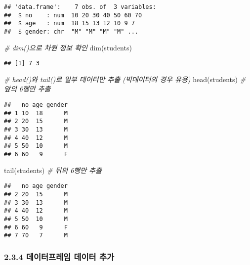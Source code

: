 \documentclass[
]{article}
\newenvironment{Shaded}{\begin{snugshade}}{\end{snugshade}}
\newcommand{\CommentTok}[1]{\textcolor[rgb]{0.56,0.35,0.01}{\textit{#1}}}
\newcommand{\FunctionTok}[1]{\textcolor[rgb]{0.00,0.00,0.00}{#1}}
\newcommand{\NormalTok}[1]{#1}
\begin{document}
\begin{verbatim}
## 'data.frame':    7 obs. of  3 variables:
##  $ no    : num  10 20 30 40 50 60 70
##  $ age   : num  18 15 13 12 10 9 7
##  $ gender: chr  "M" "M" "M" "M" ...
\end{verbatim}

\begin{Shaded}
\begin{Highlighting}[]
\CommentTok{\# dim()으로 차원 정보 확인}
\FunctionTok{dim}\NormalTok{(students)}
\end{Highlighting}
\end{Shaded}

\begin{verbatim}
## [1] 7 3
\end{verbatim}

\begin{Shaded}
\begin{Highlighting}[]
\CommentTok{\# head()와 tail()로 일부 데이터만 추출 (빅데이터의 경우 유용)}
\FunctionTok{head}\NormalTok{(students)   }\CommentTok{\# 앞의 6행만 추출}
\end{Highlighting}
\end{Shaded}

\begin{verbatim}
##   no age gender
## 1 10  18      M
## 2 20  15      M
## 3 30  13      M
## 4 40  12      M
## 5 50  10      M
## 6 60   9      F
\end{verbatim}

\begin{Shaded}
\begin{Highlighting}[]
\FunctionTok{tail}\NormalTok{(students)   }\CommentTok{\# 뒤의 6행만 추출}
\end{Highlighting}
\end{Shaded}

\begin{verbatim}
##   no age gender
## 2 20  15      M
## 3 30  13      M
## 4 40  12      M
## 5 50  10      M
## 6 60   9      F
## 7 70   7      M
\end{verbatim}

\hypertarget{uxb370uxc774uxd130uxd504uxb808uxc784-uxb370uxc774uxd130-uxcd94uxac00}{%
\subsubsection{2.3.4 데이터프레임 데이터
추가}\label{uxb370uxc774uxd130uxd504uxb808uxc784-uxb370uxc774uxd130-uxcd94uxac00}}
\end{document}
